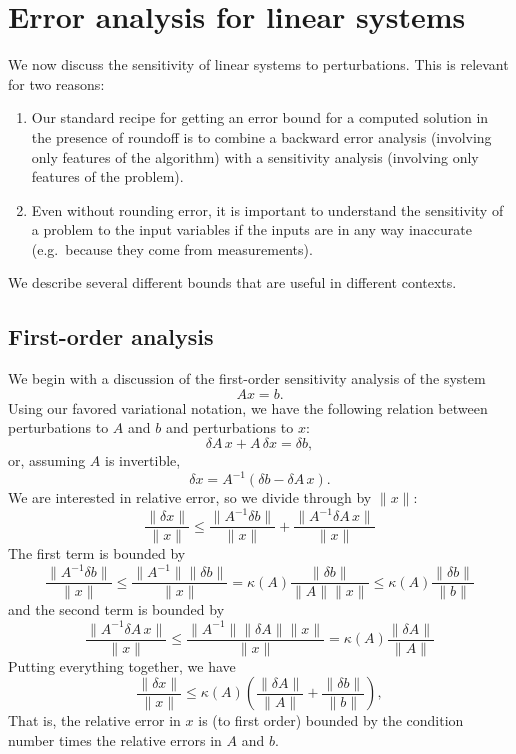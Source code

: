 \documentclass[12pt, leqno]{article} %
\begin{document}

\section{Error analysis for linear systems}

We now discuss the sensitivity of linear systems to perturbations.
This is relevant for two reasons:
\begin{enumerate}
\item Our standard recipe for getting an error bound for a computed
  solution in the presence of roundoff is to combine a backward
  error analysis (involving only features of the algorithm) with
  a sensitivity analysis (involving only features of the problem).
\item Even without rounding error, it is important to understand
  the sensitivity of a problem to the input variables if the inputs
  are in any way inaccurate (e.g.~because they come from measurements).
\end{enumerate}
We describe several different bounds that are useful in different
contexts.

\subsection{First-order analysis}

We begin with a discussion of the first-order sensitivity analysis
of the system
\[
  Ax = b.
\]
Using our favored variational notation, we have the following relation
between perturbations to $A$ and $b$ and perturbations to $x$:
\[
  \delta A \, x + A \, \delta x = \delta b,
\]
or, assuming $A$ is invertible,
\[
  \delta x = A^{-1} (\delta b - \delta A \, x).
\]
We are interested in relative error, so we divide through by $\|x\|$:
\[
  \frac{\|\delta x\|}{\|x\|} \leq
  \frac{\|A^{-1} \delta b \|}{\|x\|} + \frac{\|A^{-1} \delta A \, x\|}{\|x\|}
\]
The first term is bounded by
\[
  \frac{\|A^{-1} \delta b \|}{\|x\|} \leq
  \frac{\|A^{-1}\| \|\delta b\|}{\|x\|} =
  \kappa(A) \frac{\|\delta b\|}{\|A\| \|x\|} \leq
  \kappa(A) \frac{\|\delta b\|}{\|b\|}
\]
and the second term is bounded by
\[
  \frac{\|A^{-1} \delta A \, x\|}{\|x\|} \leq
  \frac{\|A^{-1} \| \|\delta A\| \|x\|}{\|x\|} =
  \kappa(A) \frac{\|\delta A\|}{\|A\|}
\]
Putting everything together, we have
\[
  \frac{\|\delta x\|}{\|x\|} \leq\kappa(A)
    \left( \frac{\|\delta A\|}{\|A\|} + \frac{\|\delta b\|}{\|b\|} \right),
\]
That is, the relative error in $x$ is (to first order) bounded by the
condition number times the relative errors in $A$ and $b$.
\end{document}
